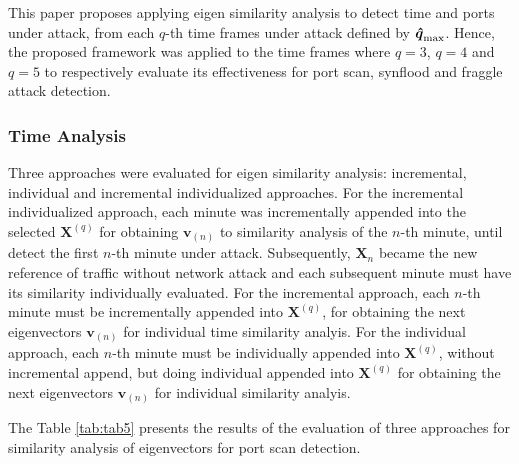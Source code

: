 \documentclass{bmcart}
\begin{document}
This paper proposes applying eigen similarity analysis to detect time and ports under attack, from each $q$-th time frames under attack defined by $\rm{\boldsymbol{\hat{q}}}_{\rm max}$. Hence, the proposed framework was applied to the time frames where $q=3$, $q=4$ and $q=5$ to respectively evaluate its effectiveness for port scan, synflood and fraggle attack detection.

\subsubsection{Time Analysis}
\label{sec:TimeAnalysis}

Three approaches were evaluated for eigen similarity analysis: incremental, individual and incremental individualized approaches. For the incremental individualized approach, each minute was incrementally appended into the selected $\boldsymbol{X}^{(q)}$ for obtaining $\boldsymbol{v}_{(n)}$ to similarity analysis of the $n$-th minute, until detect the first $n$-th minute under attack. Subsequently, $\boldsymbol{X}_n$ became the new reference of traffic without network attack and each subsequent minute must have its similarity individually evaluated. For the incremental approach, each $n$-th minute must be incrementally appended into $\boldsymbol{X}^{(q)}$, for obtaining the next eigenvectors $\boldsymbol{v}_{(n)}$ for individual time similarity analyis. For the individual approach, each $n$-th minute must be individually appended into $\boldsymbol{X}^{(q)}$, without incremental append, but doing individual appended into $\boldsymbol{X}^{(q)}$ for obtaining the next eigenvectors $\boldsymbol{v}_{(n)}$ for individual similarity analyis.

The Table \ref{tab:tab5} presents the results of the evaluation of three approaches for similarity analysis of eigenvectors for port scan detection.
\end{document}
